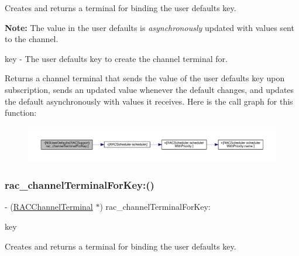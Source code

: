 Creates and returns a terminal for binding the user defaults key.

{\bfseries Note\+:} The value in the user defaults is {\itshape asynchronously} updated with values sent to the channel.

key -\/ The user defaults key to create the channel terminal for.

Returns a channel terminal that sends the value of the user defaults key upon subscription, sends an updated value whenever the default changes, and updates the default asynchronously with values it receives. Here is the call graph for this function\+:\nopagebreak
\begin{figure}[H]
\begin{center}
\leavevmode
\includegraphics[width=350pt]{category_n_s_user_defaults_07_r_a_c_support_08_a7a8d6f1a01e63adb036a2841884ae4b5_cgraph}
\end{center}
\end{figure}
\mbox{\label{category_n_s_user_defaults_07_r_a_c_support_08_a7a8d6f1a01e63adb036a2841884ae4b5}} 
\subsubsection{\texorpdfstring{rac\+\_\+channel\+Terminal\+For\+Key\+:()}{rac\_channelTerminalForKey:()}\hspace{0.1cm}{\footnotesize\ttfamily [2/3]}}
{\footnotesize\ttfamily -\/ (\mbox{\hyperlink{interface_r_a_c_channel_terminal}{R\+A\+C\+Channel\+Terminal}} $\ast$) rac\+\_\+channel\+Terminal\+For\+Key\+: \begin{DoxyParamCaption}\item[{(N\+S\+String $\ast$)}]{key }\end{DoxyParamCaption}}

Creates and returns a terminal for binding the user defaults key.

